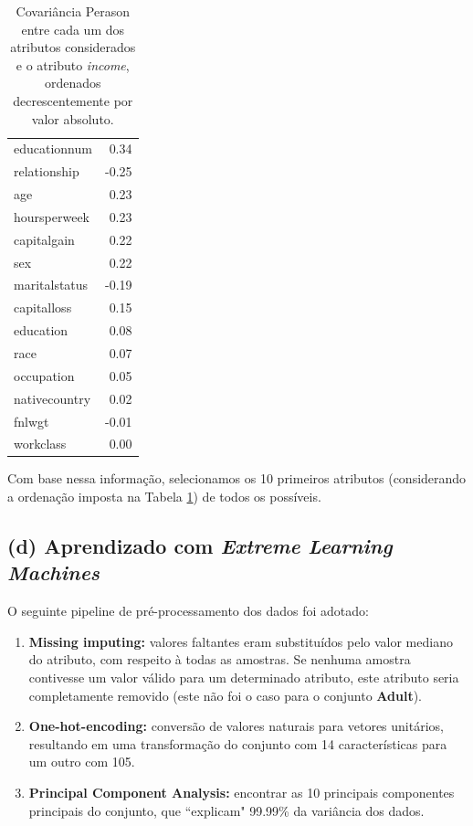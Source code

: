 \documentclass[12pt]{report}
\begin{document}
\begin{table}[H]
	\centering
	\begin{tabular}{lr}
		educationnum  & 0.34  \\
		relationship  & -0.25 \\
		age           & 0.23  \\
		hoursperweek  & 0.23   \\
		capitalgain   & 0.22  \\
		sex           & 0.22  \\
		maritalstatus & -0.19 \\
		capitalloss   & 0.15  \\
		education     & 0.08  \\
		race          & 0.07  \\
		occupation    & 0.05  \\
		nativecountry & 0.02  \\
		fnlwgt        & -0.01 \\
		workclass     & 0.00
	\end{tabular}
	\caption{Covariância Perason entre cada um dos atributos considerados e o atributo \textit{income}, ordenados decrescentemente por valor absoluto.}
	\label{tbl:features-pearson}
\end{table}
		
Com base nessa informação, selecionamos os 10 primeiros atributos (considerando a ordenação imposta na Tabela \ref{tbl:features-pearson}) de todos os possíveis.

\subsection{(d) Aprendizado com \textit{Extreme Learning Machines}}

O seguinte pipeline de pré-processamento dos dados foi adotado:

\begin{enumerate}
	\item \textbf{Missing imputing:} valores faltantes eram substituídos pelo valor mediano do atributo, com respeito à todas as amostras. Se nenhuma amostra contivesse um valor válido para um determinado atributo, este atributo seria completamente removido (este não foi o caso para o conjunto \textbf{Adult}).
	\item \textbf{One-hot-encoding:} conversão de valores naturais para vetores unitários, resultando em uma transformação do conjunto com 14 características para um outro com 105.
	\item \textbf{Principal Component Analysis:} encontrar as 10 principais componentes principais do conjunto, que ``explicam" 99.99\% da variância dos dados.
\end{enumerate}
\end{document}
